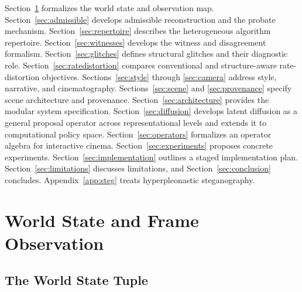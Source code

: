 \documentclass[12pt,a4paper]{article}
\theoremstyle{plain}
\theoremstyle{definition}
\theoremstyle{remark}
\begin{document}
Section~\ref{sec:worldstate} formalizes the world state and observation map. Section~\ref{sec:admissible} develops admissible reconstruction and the probate mechanism. Section~\ref{sec:repertoire} describes the heterogeneous algorithm repertoire. Section~\ref{sec:witnesses} develops the witness and disagreement formalism. Section~\ref{sec:glitches} defines structural glitches and their diagnostic role. Section~\ref{sec:ratedistortion} compares conventional and structure-aware rate-distortion objectives. Sections~\ref{sec:style} through \ref{sec:camera} address style, narrative, and cinematography. Sections~\ref{sec:scene} and \ref{sec:provenance} specify scene architecture and provenance. Section~\ref{sec:architecture} provides the modular system specification. Section~\ref{sec:diffusion} develops latent diffusion as a general proposal operator across representational levels and extends it to computational policy space. Section~\ref{sec:operators} formalizes an operator algebra for interactive cinema. Section~\ref{sec:experiments} proposes concrete experiments. Section~\ref{sec:implementation} outlines a staged implementation plan. Section~\ref{sec:limitations} discusses limitations, and Section~\ref{sec:conclusion} concludes. Appendix~\ref{app:steg} treats hyperpleonastic steganography.

\section{World State and Frame Observation}
\label{sec:worldstate}

\subsection{The World State Tuple}
\end{document}
